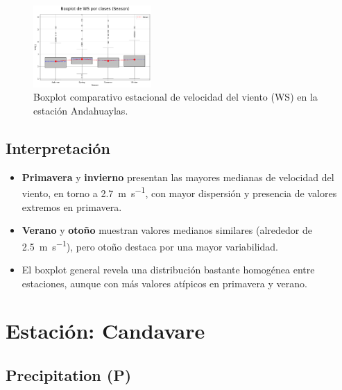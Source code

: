 \vspace{0.2cm}

\begin{figure}[H]
\centering
\includegraphics[width=0.4\textwidth]{resultados/por_estacion_del_anio/boxplot_clases_por_estacion/Andahuaylas/WS_ClassBoxplot_Season.png}
\caption{Boxplot comparativo estacional de velocidad del viento (WS) en la estación Andahuaylas.}
\label{fig:andahuaylas_ws_box}
\end{figure}

\subsection*{Interpretación}

\begin{itemize}
    \item \textbf{Primavera} y \textbf{invierno} presentan las mayores medianas de velocidad del viento, en torno a \SI{2.7}{\meter\per\second}, con mayor dispersión y presencia de valores extremos en primavera.
    \item \textbf{Verano} y \textbf{otoño} muestran valores medianos similares (alrededor de \SI{2.5}{\meter\per\second}), pero otoño destaca por una mayor variabilidad.
    \item El boxplot general revela una distribución bastante homogénea entre estaciones, aunque con más valores atípicos en primavera y verano.
\end{itemize}

\section{Estación: Candavare}

\subsection{Precipitation (P)}

